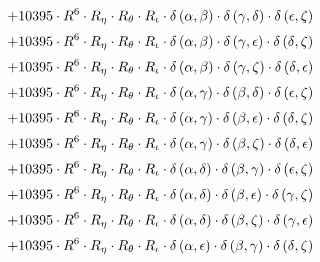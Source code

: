 \begin{subequations}
\begin{gather}
 \\[0.2em] \notag 		 + 10395 \cdot R^{6} \cdot R_{\eta{}} \cdot R_{\theta{}} \cdot R_{\iota{}} \cdot \delta{}\left(\alpha{}, \beta{}\right) \cdot \delta{}\left(\gamma{}, \delta{}\right) \cdot \delta{}\left(\epsilon{}, \zeta{}\right) 
 \\[0.2em] \notag 		 + 10395 \cdot R^{6} \cdot R_{\eta{}} \cdot R_{\theta{}} \cdot R_{\iota{}} \cdot \delta{}\left(\alpha{}, \beta{}\right) \cdot \delta{}\left(\gamma{}, \epsilon{}\right) \cdot \delta{}\left(\delta{}, \zeta{}\right) 
 \\[0.2em] \notag 		 + 10395 \cdot R^{6} \cdot R_{\eta{}} \cdot R_{\theta{}} \cdot R_{\iota{}} \cdot \delta{}\left(\alpha{}, \beta{}\right) \cdot \delta{}\left(\gamma{}, \zeta{}\right) \cdot \delta{}\left(\delta{}, \epsilon{}\right) 
 \\[0.2em] \notag 		 + 10395 \cdot R^{6} \cdot R_{\eta{}} \cdot R_{\theta{}} \cdot R_{\iota{}} \cdot \delta{}\left(\alpha{}, \gamma{}\right) \cdot \delta{}\left(\beta{}, \delta{}\right) \cdot \delta{}\left(\epsilon{}, \zeta{}\right) 
 \\[0.2em] \notag 		 + 10395 \cdot R^{6} \cdot R_{\eta{}} \cdot R_{\theta{}} \cdot R_{\iota{}} \cdot \delta{}\left(\alpha{}, \gamma{}\right) \cdot \delta{}\left(\beta{}, \epsilon{}\right) \cdot \delta{}\left(\delta{}, \zeta{}\right) 
 \\[0.2em] \notag 		 + 10395 \cdot R^{6} \cdot R_{\eta{}} \cdot R_{\theta{}} \cdot R_{\iota{}} \cdot \delta{}\left(\alpha{}, \gamma{}\right) \cdot \delta{}\left(\beta{}, \zeta{}\right) \cdot \delta{}\left(\delta{}, \epsilon{}\right) 
 \\[0.2em] \notag 		 + 10395 \cdot R^{6} \cdot R_{\eta{}} \cdot R_{\theta{}} \cdot R_{\iota{}} \cdot \delta{}\left(\alpha{}, \delta{}\right) \cdot \delta{}\left(\beta{}, \gamma{}\right) \cdot \delta{}\left(\epsilon{}, \zeta{}\right) 
 \\[0.2em] \notag 		 + 10395 \cdot R^{6} \cdot R_{\eta{}} \cdot R_{\theta{}} \cdot R_{\iota{}} \cdot \delta{}\left(\alpha{}, \delta{}\right) \cdot \delta{}\left(\beta{}, \epsilon{}\right) \cdot \delta{}\left(\gamma{}, \zeta{}\right) 
 \\[0.2em] \notag 		 + 10395 \cdot R^{6} \cdot R_{\eta{}} \cdot R_{\theta{}} \cdot R_{\iota{}} \cdot \delta{}\left(\alpha{}, \delta{}\right) \cdot \delta{}\left(\beta{}, \zeta{}\right) \cdot \delta{}\left(\gamma{}, \epsilon{}\right) 
 \\[0.2em] \notag 		 + 10395 \cdot R^{6} \cdot R_{\eta{}} \cdot R_{\theta{}} \cdot R_{\iota{}} \cdot \delta{}\left(\alpha{}, \epsilon{}\right) \cdot \delta{}\left(\beta{}, \gamma{}\right) \cdot \delta{}\left(\delta{}, \zeta{}\right) 

\end{gather}
\end{subequations}
